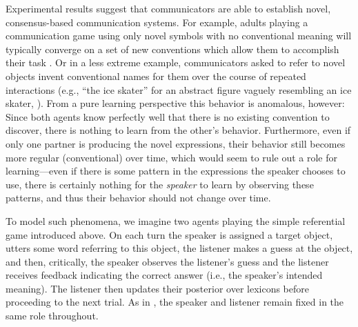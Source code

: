 \documentclass{article} %
\begin{document}
Experimental results suggest that communicators are able to establish
novel, consensus-based communication systems. For example, adults
playing a communication game using only novel symbols with no
conventional meaning will typically converge on a set of new
conventions which allow them to accomplish their task
\cite{galantucci2005}. Or in a less extreme example, communicators
asked to refer to novel objects invent conventional names for them
over the course of repeated interactions (e.g., ``the ice skater'' for
an abstract figure vaguely resembling an ice skater,
\cite{clark1986}). From a pure learning perspective this behavior is anomalous,
however: Since both agents know perfectly well that there is no
existing convention to discover, there is nothing to learn from the
other's behavior. Furthermore, even if only one partner is producing
the novel expressions, their behavior still becomes more regular
(conventional) over time, which would seem to rule out a role for
learning---even if there is some pattern in the expressions the
speaker chooses to use, there is certainly nothing for the
\textit{speaker} to learn by observing these patterns, and thus their
behavior should not change over time.


To model such phenomena, we imagine two agents playing the simple
referential game introduced above. On each turn the speaker is
assigned a target object, utters some word referring to this object,
the listener makes a guess at the object, and then, critically, the
speaker observes the listener's guess and the listener receives
feedback indicating the correct answer (i.e., the speaker's intended
meaning). The listener then updates their posterior over lexicons
before proceeding to the next trial. As in
\cite{krauss1964,clark1986}, the speaker and listener remain fixed in
the same role throughout.
\end{document}
